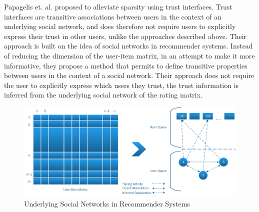 


Papagelis et. al. \cite{Papagelis2005} proposed to alleviate sparsity using
trust interfaces. Trust interfaces are transitive associations between users in
the context of an underlying social network, and does therefore not require users to explicitly express their trust in other users, unlike the approaches described above. Their approach is built on the
idea of social networks in recommender systems. Instead of reducing the
dimension of the user-item matrix, in an attempt to make it more informative,
they propose a method that permits to define transitive properties between
users in the context of a social network. Their approach does not require the
user to explicitly express which users they trust, the trust information is
inferred from the underlying social network of the rating matrix.

\begin{figure}[H]
    \includegraphics[width=5in]{image/trustnetwork.png}
    \centering
    \caption[Underlying Social Networks in Recommender Systems]{Underlying Social Networks in Recommender Systems}
    \label{figure:cfsocialnetwork}
\end{figure}

